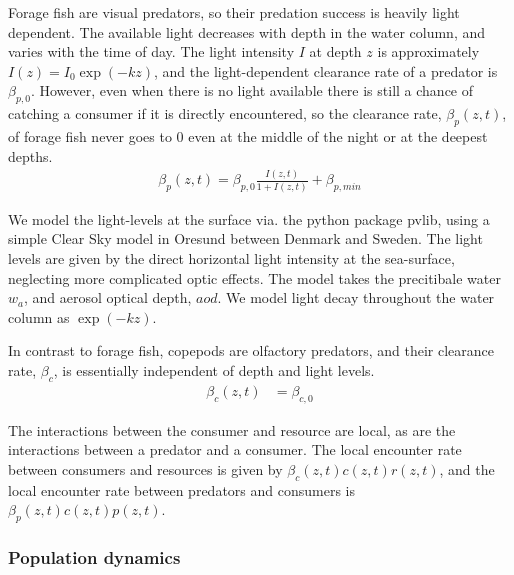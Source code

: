 Forage fish are visual predators, so their predation success is heavily light dependent. The available light decreases with depth in the water column, and varies with the time of day.
The light intensity $I$ at depth $z$ is approximately $I(z) = I_0\exp(-kz)$, and the light-dependent clearance rate of a predator is $\beta_{p,0}$.  However, even when there is no light available there is still a chance of catching a consumer if it is directly encountered,  so the clearance rate, $\beta_p(z,t)$, of forage fish never goes to 0 even at the middle of the night or at the deepest depths.
\begin{align*}
  \beta_p(z,t) = \beta_{p,0} \frac{I(z,t)}{1+I(z,t)} + \beta_{p,min}
\end{align*}


We model the light-levels at the surface via. the python package pvlib, using a simple Clear Sky model in Oresund between Denmark and Sweden. The light levels are given by the direct horizontal light intensity at the sea-surface, neglecting more complicated optic effects. The model takes the precitibale water $w_a$, and aerosol optical depth, $aod$. We model light decay throughout the water column as $\exp(-kz)$.


In contrast to forage fish, copepods are olfactory predators, and their clearance rate, $\beta_c$, is essentially independent of depth and light levels.
\begin{align*}
	\beta_c(z,t) &=  \beta_{c,0}
\end{align*}

The interactions between the consumer and resource are local, as are the interactions between a predator and a consumer. The local encounter rate between consumers and resources is given by $\beta_c(z,t)c(z,t)r(z,t)$, and the local encounter rate between predators and consumers is $\beta_p(z,t)c(z,t)p(z,t)$.

\subsubsection*{Population dynamics}

